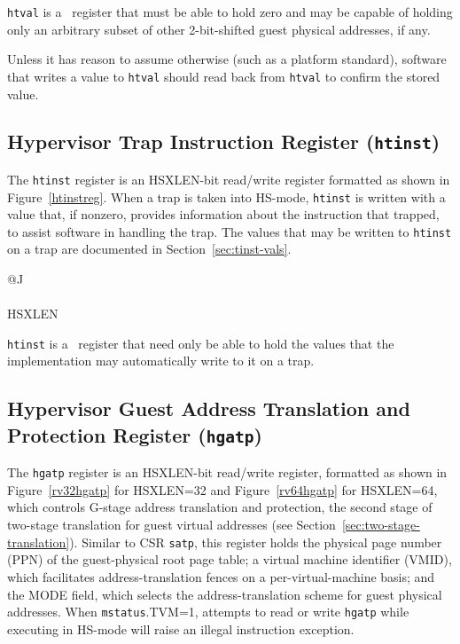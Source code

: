 {\tt htval} is a \warl\ register that must be able to hold zero and may
be capable of holding only an arbitrary subset of other 2-bit-shifted
guest physical addresses, if any.

\begin{commentary}
Unless it has reason to assume otherwise (such as a platform standard),
software that writes a value to {\tt htval} should read back from
{\tt htval} to confirm the stored value.
\end{commentary}

\subsection{Hypervisor Trap Instruction Register ({\tt htinst})}

The {\tt htinst} register is an HSXLEN-bit read/write register formatted
as shown in Figure~\ref{htinstreg}.
When a trap is taken into HS-mode, {\tt htinst} is written with a value
that, if nonzero, provides information about the instruction that
trapped, to assist software in handling the trap.
The values that may be written to {\tt htinst} on a trap are documented
in Section~\ref{sec:tinst-vals}.

\begin{figure*}[h!]
{\footnotesize
\begin{center}
\begin{tabular}{@{}J}
 \\
\hline
{} \\
\hline
HSXLEN \\
\end{tabular}
\end{center}
}
\vspace{-0.1in}
\caption{Hypervisor trap instruction register ({\tt htinst}).}
\label{htinstreg}
\end{figure*}

{\tt htinst} is a \warl\ register that need only be able to hold the
values that the implementation may automatically write to it on a trap.

\subsection{Hypervisor Guest Address Translation and Protection Register ({\tt hgatp})}
\label{sec:hgatp}

The {\tt hgatp} register is an HSXLEN-bit read/write register, formatted as
shown in Figure~\ref{rv32hgatp} for HSXLEN=32 and Figure~\ref{rv64hgatp} for
HSXLEN=64, which controls G-stage address translation and protection, the
second stage of two-stage translation for guest virtual addresses (see
Section~\ref{sec:two-stage-translation}).
Similar to CSR {\tt satp}, this register holds the physical page number (PPN)
of the guest-physical root page table; a virtual machine identifier (VMID),
which facilitates address-translation fences on a per-virtual-machine basis;
and the MODE field, which selects the address-translation scheme for guest
physical addresses.
When {\tt mstatus}.TVM=1, attempts to read or write {\tt hgatp} while executing
in HS-mode will raise an illegal instruction exception.


